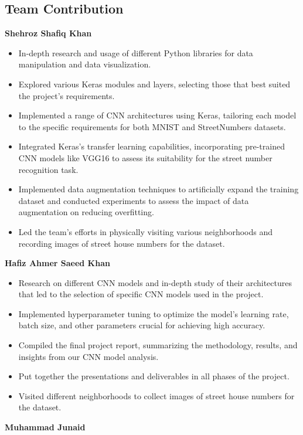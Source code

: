 \documentclass[12pt,a4paper]{article}
\begin{document}
\subsection*{Team Contribution}
\textbf{Shehroz Shafiq Khan}
\begin{itemize}
    \item In-depth research and usage of different Python libraries for data manipulation and data visualization.
    \item Explored various Keras modules and layers, selecting those that best suited the project's requirements.
    \item Implemented a range of CNN architectures using Keras, tailoring each model to the specific requirements for both MNIST and StreetNumbers datasets.
    \item Integrated Keras's transfer learning capabilities, incorporating pre-trained CNN models like VGG16 to assess its suitability for the street number recognition task.
    \item Implemented data augmentation techniques to artificially expand the training dataset and conducted experiments to assess the impact of data augmentation on reducing overfitting.
    \item Led the team's efforts in physically visiting various neighborhoods and recording images of street house numbers for the dataset.
\end{itemize}
\linebreak
\newline \textbf{Hafiz Ahmer Saeed Khan}
\begin{itemize}
    \item Research on different CNN models and in-depth study of their architectures that led to the selection of specific CNN models used in the project.
    \item Implemented hyperparameter tuning to optimize the model's learning rate, batch size, and other parameters crucial for achieving high accuracy.
    \item Compiled the final project report, summarizing the methodology, results, and insights from our CNN model analysis.
    \item Put together the presentations and deliverables in all phases of the project.
    \item Visited different neighborhoods to collect images of street house numbers for the dataset.
\end{itemize}
\pagebreak
\newline \textbf{Muhammad Junaid} 
\end{document}
